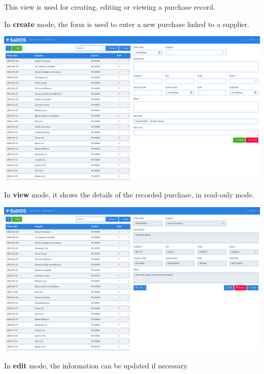 \documentclass[a4paper]{article}
\begin{document}
This view is used for creating, editing or viewing a purchase record.

In \textbf{create} mode, the form is used to enter a new purchase linked to a supplier.

\begin{center}\includegraphics[width=1\textwidth]{../ujest/snaps/test-screenshots-js-screenshots-purchases-purchase-create-en-us-1-snap.png}\end{center}

In \textbf{view} mode, it shows the details of the recorded purchase, in read-only mode.

\begin{center}\includegraphics[width=1\textwidth]{../ujest/snaps/test-screenshots-js-screenshots-purchases-purchase-view-100-en-us-1-snap.png}\end{center}

In \textbf{edit} mode, the information can be updated if necessary.
\end{document}
